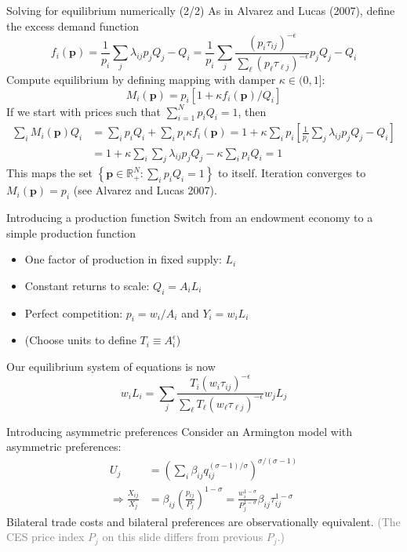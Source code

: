 \documentclass[10pt,notes=hide]{beamer}
\begin{document}
\begin{frame}{Solving for equilibrium numerically (2/2)}
As in Alvarez and Lucas (2007), define the excess demand function
$$
f_i(\mathbf{p}) 
=
\frac{1}{p_i} \sum_{j} \lambda_{ij} p_j Q_j - Q_i
=
\frac{1}{p_i} \sum_{j}
\frac{\left(p_i\tau_{ij}\right)^{-\epsilon}}{\sum_{\ell} \left(p_{\ell} \tau_{\ell j}\right)^{-\epsilon}}
p_j Q_j - Q_i
$$
Compute equilibrium by defining mapping with damper $\kappa \in (0,1]$:
$$M_i(\mathbf{p}) = p_i \left[1 + \kappa f_i(\mathbf{p}) / Q_{i}\right]$$
If we start with prices such that $\sum_{i=1}^{N} p_i Q_i = 1$, then
\begin{align*}
\sum_{i} M_i(\mathbf{p}) Q_i
&=
\sum_{i} p_i Q_i + \sum_{i} p_i \kappa f_i(\mathbf{p})
=
1 + \kappa \sum_{i} p_i \left[\frac{1}{p_i} \sum_{j} \lambda_{ij} p_j Q_j - Q_i\right]
\\
&=
1 + \kappa \sum_{i} \sum_{j} \lambda_{ij} p_j Q_j - \kappa \sum_{i} p_i  Q_i
=
1
\end{align*}
This maps the set $\left\{\mathbf{p} \in \mathbb{R}^{N}_{+}: \sum_{i} p_i Q_i = 1\right\}$ to itself.
Iteration converges to $M_{i}(\mathbf{p}) = p_i$ (see Alvarez and Lucas 2007).
\end{frame}
\begin{frame}{Introducing a production function}
Switch from an endowment economy to a simple production function
\begin{itemize}
\item 
One factor of production in fixed supply: $L_i$
\item
Constant returns to scale: $Q_i = A_i L_i$
\item
Perfect competition: $p_{i} = w_i / A_i$ and $Y_i = w_i L_i$
\item
(Choose units to define $T_i \equiv A_i^{\epsilon}$)
\end{itemize}
Our equilibrium system of equations is now
$$
w_i L_i
=
\sum_j \frac{T_i \left(w_i \tau_{ij}\right)^{-\epsilon}}{\sum_{\ell} T_{\ell} \left(w_{\ell} \tau_{\ell j}\right)^{-\epsilon}} w_j L_j
$$
\end{frame}
\begin{frame}{Introducing asymmetric preferences}
Consider an Armington model with asymmetric preferences:
\begin{align*}
	U_j &= \left(\sum_{i} \beta_{ij} q_{ij}^{(\sigma-1)/\sigma}\right)^{\sigma/(\sigma-1)}
	\\
	\Rightarrow
	\frac{X_{ij}}{X_j} &= \beta_{ij} \left(\frac{p_{ij}}{P_j}\right)^{1-\sigma} 
	=
	\frac{w_i^{1-\sigma}}{P_j^{1-\sigma}}\beta_{ij}\tau_{ij}^{1-\sigma}
\end{align*}
Bilateral trade costs and bilateral preferences are observationally equivalent.
\textcolor{gray}{(The CES price index $P_j$ on this slide differs from previous $P_j$.)}
\end{frame}
\end{document}
